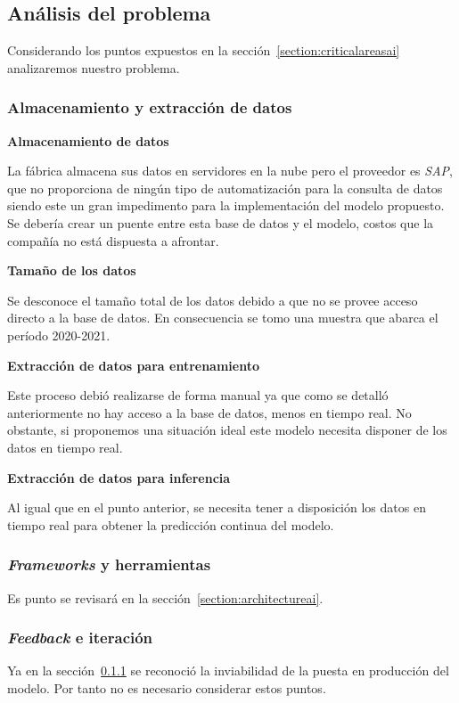 \documentclass[a4paper,12pt]{article}
\begin{document}
		\subsection{Análisis del problema}\label{problems}
		Considerando los puntos expuestos en la sección~\ref{section:criticalareasai} analizaremos nuestro problema.
		\subsubsection{Almacenamiento y extracción de datos}\label{dataextractfsi}
		\textbf{Almacenamiento de datos}
				
		La fábrica almacena sus datos en servidores en la nube pero el proveedor es \textit{SAP}, que no proporciona de ningún tipo de automatización para la consulta de datos siendo este un gran impedimento para la implementación del modelo propuesto. Se debería crear un puente entre esta base de datos y el modelo, costos que la compañía no está dispuesta a afrontar.
				
		\textbf{Tamaño de los datos}
				
		Se desconoce el tamaño total de los datos debido a que no se provee acceso directo a la base de datos. En consecuencia se tomo una muestra que abarca el período 2020-2021.
				
		\textbf{Extracción de datos para entrenamiento}
				
		Este proceso debió realizarse de forma manual ya que como se detalló anteriormente no hay acceso a la base de datos, menos en tiempo real. No obstante, si proponemos una situación ideal este modelo necesita disponer de los datos en tiempo real.
				
		\textbf{Extracción de datos para inferencia}
				
		Al igual que en el punto anterior, se necesita tener a disposición los datos en tiempo real para obtener la predicción continua del modelo.
				
		\subsubsection{\textit{Frameworks} y herramientas}
		Es punto se revisará en la sección~\ref{section:architectureai}.
				
		\subsubsection{\textit{Feedback} e iteración}
		Ya en la sección~\ref{dataextractfsi} se reconoció la inviabilidad de la puesta en producción del modelo. Por tanto no es necesario considerar estos puntos.
				
\end{document}
